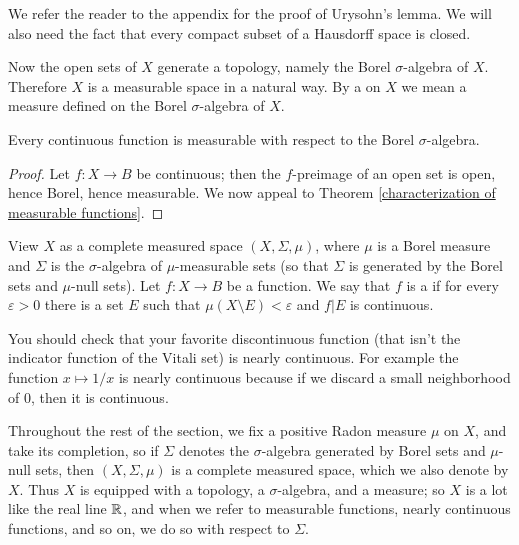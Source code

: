 \begin{subsec}
We refer the reader to the appendix for the proof of Urysohn's lemma.
We will also need the fact that every compact subset of a Hausdorff space is closed.
\end{subsec}

\begin{subsec}
Now the open sets of $X$ generate a topology, namely the Borel $\sigma$-algebra of $X$. Therefore $X$ is a measurable space in a natural way.
By a  on $X$ we mean a measure defined on the Borel $\sigma$-algebra of $X$.
\end{subsec}

\begin{lemma}
Every continuous function is measurable with respect to the Borel $\sigma$-algebra.
\end{lemma}
\begin{proof}
Let $f: X \to B$ be continuous; then the $f$-preimage of an open set is open, hence Borel, hence measurable.
We now appeal to Theorem \ref{characterization of measurable functions}.
\end{proof}

\begin{definition}
View $X$ as a complete measured space $(X, \Sigma, \mu)$, where $\mu$ is a Borel measure and $\Sigma$ is the $\sigma$-algebra of $\mu$-measurable sets (so that $\Sigma$ is generated by the Borel sets and $\mu$-null sets).
Let $f: X \to B$ be a function.
We say that $f$ is a  if for every $\varepsilon > 0$ there is a set $E$ such that $\mu(X \setminus E) < \varepsilon$ and $f|E$ is continuous.
\end{definition}

\begin{subsec}
You should check that your favorite discontinuous function (that isn't the indicator function of the Vitali set) is nearly continuous.
For example the function $x \mapsto 1/x$ is nearly continuous because if we discard a small neighborhood of $0$, then it is continuous.
\end{subsec}

\begin{subsec}
Throughout the rest of the section, we fix a positive Radon measure $\mu$ on $X$, and take its completion, so if $\Sigma$ denotes the $\sigma$-algebra generated by Borel sets and $\mu$-null sets, then $(X, \Sigma, \mu)$ is a complete measured space, which we also denote by $X$.
Thus $X$ is equipped with a topology, a $\sigma$-algebra, and a measure; so $X$ is a lot like the real line $\mathbb{R}$, and when we refer to measurable functions, nearly continuous functions, and so on, we do so with respect to $\Sigma$.
\end{subsec}

